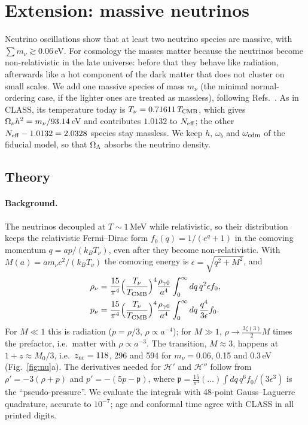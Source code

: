 \section{Extension: massive neutrinos}\label{sec:neutrinos}

Neutrino oscillations show that at least two neutrino species are massive, with $\sum m_\nu\gtrsim0.06$\,eV. For
cosmology the masses matter because the neutrinos become non-relativistic in the late universe: before that they
behave like radiation, afterwards like a hot component of the dark matter that does not cluster on small scales. We
add one massive species of mass $m_\nu$ (the minimal normal-ordering case, if the lighter ones are treated as
massless), following Refs.~\cite{Ma1995,LesgourguesTram2011,LesgourguesPastor2006}. As in CLASS, its temperature
today is $T_{\nu}=0.71611\,T_{\rm CMB}$, which gives $\Omega_\nu h^2=m_\nu/93.14$\,eV and contributes $1.0132$ to
$N_{\rm eff}$; the other $N_{\rm eff}-1.0132=2.0328$ species stay massless. We keep $h$, $\omega_b$ and $\omega_{\rm cdm}$
of the fiducial model, so that $\Omega_\Lambda$ absorbs the neutrino density.

\subsection{Theory}

\paragraph*{Background.} The neutrinos decoupled at $T\sim1$\,MeV while relativistic, so their distribution keeps the
relativistic Fermi--Dirac form $f_0(q)=1/(e^q+1)$ in the comoving momentum $q=ap/(k_BT_{\nu})$, even after they
become non-relativistic. With $M(a)=am_\nu c^2/(k_BT_{\nu})$ the comoving energy is $\epsilon=\sqrt{q^2+M^2}$, and
\begin{align}
\rho_\nu&=\frac{15}{\pi^4}\Big(\frac{T_\nu}{T_{\rm CMB}}\Big)^4\frac{\rho_{\gamma0}}{a^4}\int_0^\infty dq\,q^2\epsilon f_0,\\
p_\nu&=\frac{15}{\pi^4}\Big(\frac{T_\nu}{T_{\rm CMB}}\Big)^4\frac{\rho_{\gamma0}}{a^4}\int_0^\infty dq\,\frac{q^4}{3\epsilon}f_0 .
\end{align}
For $M\ll1$ this is radiation ($p=\rho/3$, $\rho\propto a^{-4}$); for $M\gg1$, $\rho\to\frac{3\zeta(3)}{2}M$ times the
prefactor, i.e.\ matter with $\rho\propto a^{-3}$. The transition, $M\approx3$, happens at $1+z\approx M_0/3$, i.e.\
$z_{\rm nr}=118$, 296 and 594 for $m_\nu=0.06$, 0.15 and 0.3\,eV (Fig.~\ref{fig:nu}a). The derivatives needed for
$\mathcal H'$ and $\mathcal H''$ follow from $\rho'=-3(\rho+p)$ and $p'=-(5p-\mathfrak p)$, where
$\mathfrak p=\frac{15}{\pi^4}(\dots)\int dq\,q^6f_0/(3\epsilon^3)$ is the ``pseudo-pressure''. We evaluate the
integrals with 48-point Gauss--Laguerre quadrature, accurate to $10^{-7}$; age and conformal time agree with CLASS in
all printed digits.

